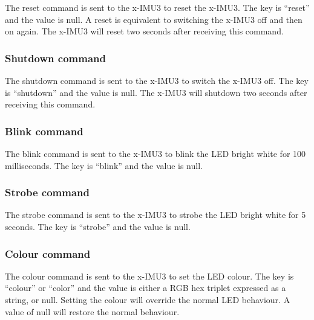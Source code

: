 The reset command is sent to the x-IMU3 to reset the x-IMU3.  The key is \enquote{reset} and the value is null.  A reset is equivalent to switching the x-IMU3 off and then on again.  The x-IMU3 will reset two seconds after receiving this command.


\subsubsection{Shutdown command}

The shutdown command is sent to the x-IMU3 to switch the x-IMU3 off.  The key is \enquote{shutdown} and the value is null.  The x-IMU3 will shutdown two seconds after receiving this command.


\subsubsection{Blink command}
\label{sec:blinkCommand}

The blink command is sent to the x-IMU3 to blink the \ac{LED} bright white for 100 milliseconds.  The key is \enquote{blink} and the value is null.


\subsubsection{Strobe command}
\label{sec:strobeCommand}

The strobe command is sent to the x-IMU3 to strobe the \ac{LED} bright white for 5 seconds.  The key is \enquote{strobe} and the value is null.


\subsubsection{Colour command}
\label{sec:colourCommand}

The colour command is sent to the x-IMU3 to set the \ac{LED} colour.  The key is \enquote{colour} or \enquote{color} and the value is either a \ac{RGB} hex triplet expressed as a string, or null.  Setting the colour will override the normal \ac{LED} behaviour.  A value of null will restore the normal behaviour.


